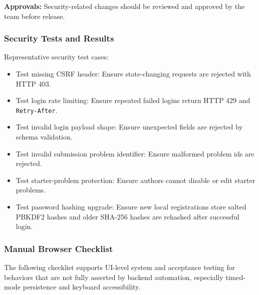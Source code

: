 \textbf{Approvals:}
Security-related changes should be reviewed and approved by the team before release.

\subsubsection{Security Tests and Results}
Representative security test cases:
\begin{itemize}
    \item Test missing CSRF header: Ensure state-changing requests are rejected with HTTP 403.
    \item Test login rate limiting: Ensure repeated failed logins return HTTP 429 and \texttt{Retry-After}.
    \item Test invalid login payload shape: Ensure unexpected fields are rejected by schema validation.
    \item Test invalid submission problem identifier: Ensure malformed problem ids are rejected.
    \item Test starter-problem protection: Ensure authors cannot disable or edit starter problems.
    \item Test password hashing upgrade: Ensure new local registrations store salted PBKDF2 hashes and older SHA-256 hashes are rehashed after successful login.
\end{itemize}

\subsubsection{Manual Browser Checklist}
The following checklist supports UI-level system and acceptance testing for behaviors that are not fully asserted by backend automation, especially timed-mode persistence and keyboard accessibility.

